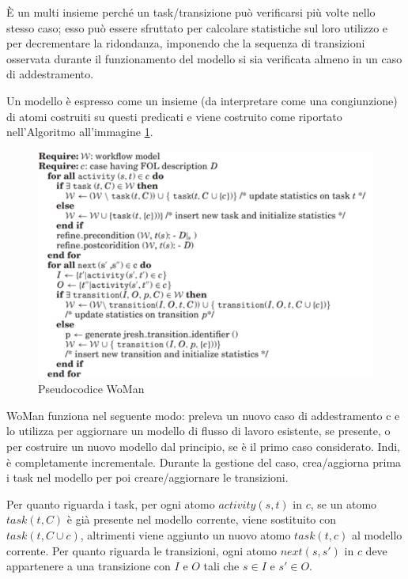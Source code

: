 È un multi insieme perché un task/transizione può verificarsi più volte nello stesso caso; esso può essere sfruttato per calcolare statistiche sul loro utilizzo e per decrementare la ridondanza, imponendo che la sequenza di transizioni osservata durante il funzionamento del modello si sia verificata almeno in un caso di addestramento. 

Un modello è espresso come un insieme (da interpretare come una congiunzione) di atomi costruiti su questi predicati e viene costruito come riportato nell'Algoritmo all'immagine \ref{fig:image18}.

\begin{figure}
    \begin{center}    
        \includegraphics[width=0.9\linewidth]{images/53.png}
        \caption{Pseudocodice WoMan}
        \label{fig:image18}
    \end{center}
\end{figure}
 

WoMan funziona nel seguente modo: preleva un nuovo caso di addestramento c e lo utilizza per aggiornare un modello di flusso di lavoro esistente, se presente, o per costruire un nuovo modello dal principio, se è il primo caso considerato. Indi, è completamente incrementale. Durante la gestione del caso, crea/aggiorna prima i task nel modello per poi creare/aggiornare le transizioni. 

Per quanto riguarda i task, per ogni atomo $activity(s, t)$ in $c$, se un atomo $task(t, C)$ è già presente nel modello corrente, viene sostituito con $task(t, C \cup {c})$, altrimenti viene aggiunto un nuovo atomo $task(t, {c})$ al modello corrente. Per quanto riguarda le transizioni, ogni atomo $next(s, s')$ in $c$ deve appartenere a una transizione con $I$ e $O$ tali che $s \in I$ e $s' \in O$.

